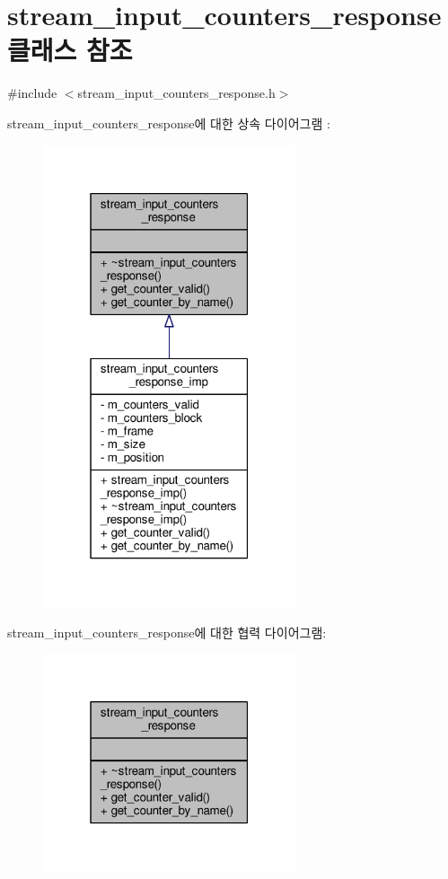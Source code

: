 \hypertarget{classavdecc__lib_1_1stream__input__counters__response}{}\section{stream\+\_\+input\+\_\+counters\+\_\+response 클래스 참조}
\label{classavdecc__lib_1_1stream__input__counters__response}


{\ttfamily \#include $<$stream\+\_\+input\+\_\+counters\+\_\+response.\+h$>$}



stream\+\_\+input\+\_\+counters\+\_\+response에 대한 상속 다이어그램 \+: 
\nopagebreak
\begin{figure}[H]
\begin{center}
\leavevmode
\includegraphics[width=211pt]{classavdecc__lib_1_1stream__input__counters__response__inherit__graph}
\end{center}
\end{figure}


stream\+\_\+input\+\_\+counters\+\_\+response에 대한 협력 다이어그램\+:
\nopagebreak
\begin{figure}[H]
\begin{center}
\leavevmode
\includegraphics[width=211pt]{classavdecc__lib_1_1stream__input__counters__response__coll__graph}
\end{center}
\end{figure}
